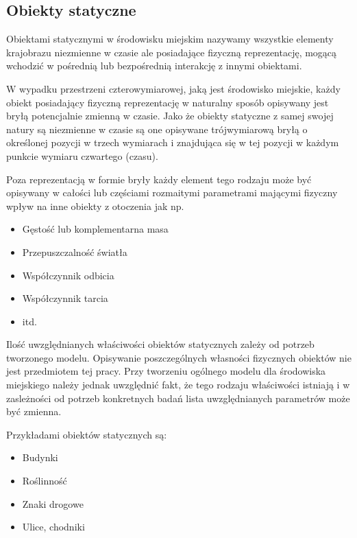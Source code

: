 {\subsection{Obiekty statyczne}
\par{
Obiektami statycznymi w środowisku miejskim nazywamy wszystkie elementy krajobrazu niezmienne w czasie ale posiadające fizyczną reprezentację, mogącą wchodzić w pośrednią lub bezpośrednią interakcję z innymi obiektami.
}
\par{
W wypadku przestrzeni czterowymiarowej, jaką jest środowisko miejskie, każdy obiekt posiadający fizyczną reprezentację w naturalny sposób opisywany jest bryłą potencjalnie zmienną w czasie. Jako że obiekty statyczne z samej swojej natury są niezmienne w czasie są one opisywane trójwymiarową bryłą o określonej pozycji w trzech wymiarach i znajdująca się w tej pozycji w każdym punkcie wymiaru czwartego (czasu).
}
\par{
Poza reprezentacją w formie bryły każdy element tego rodzaju może być opisywany w całości lub częściami rozmaitymi parametrami mającymi fizyczny wpływ na inne obiekty z otoczenia jak np.
\begin{itemize}
\item Gęstość lub komplementarna masa
\item Przepuszczalność światła
\item Współczynnik odbicia
\item Współczynnik tarcia
\item itd.
\end{itemize}
}
\par{
Ilość uwzględnianych właściwości obiektów statycznych zależy od potrzeb tworzonego modelu. Opisywanie poszczególnych własności fizycznych obiektów nie jest przedmiotem tej pracy. Przy tworzeniu ogólnego modelu dla środowiska miejskiego należy jednak uwzględnić fakt, że tego rodzaju właściwości istniają i w zasleżności od potrzeb konkretnych badań lista uwzględnianych parametrów może być zmienna.
}
\par{
Przykładami obiektów statycznych są:
\begin{itemize}
\item Budynki
\item Roślinność
\item Znaki drogowe
\item Ulice, chodniki
\end{itemize}
}
}
